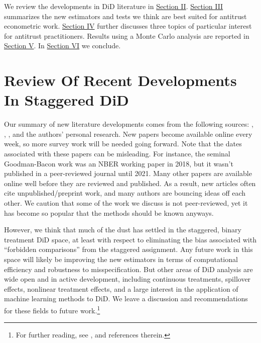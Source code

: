 \documentclass[12pt]{article}
\begin{document}
We review the developments in DiD literature in \hyperref[sec:literature]{Section II}. \hyperref[sec:analysis]{Section III} summarizes the new estimators and tests we think are best suited for antitrust econometric work. \hyperref[sec:antitrust]{Section IV} further discusses three topics of particular interest for antitrust practitioners. Results using a Monte Carlo analysis are reported in \hyperref[sec:analysis]{Section V}. In \hyperref[sec:conclusion]{Section VI} we conclude.

\section{Review Of Recent Developments In Staggered DiD} \label{sec:literature}
\begin{singlespace*}
\end{singlespace*}
\noindent Our summary of new literature developments comes from the following sources: \citet{baker2022much}, \citet{de2023two}, \citet{roth2023s}, and the authors’ personal research. New papers become available online every week, so more survey work will be needed going forward. Note that the dates associated with these papers can be misleading. For instance, the seminal Goodman-Bacon work was an NBER working paper in 2018,  but it wasn’t published in a peer-reviewed journal until 2021. Many other papers are available online well before they are reviewed and published. As a result, new articles often cite unpublished/preprint work, and many authors are bouncing ideas off each other. We caution that some of the work we discuss is not peer-reviewed, yet it has become so popular that the methods should be known anyways.

However, we think that much of the dust has settled in the staggered, binary treatment DiD space, at least with respect to eliminating the bias associated with “forbidden comparisons” from the staggered assignment. Any future work in this space will likely be improving the new estimators in terms of computational efficiency and robustness to misspecification. But other areas of DiD analysis are wide open and in active development, including continuous treatments, spillover effects, nonlinear treatment effects, and a large interest in the application of machine learning methods to DiD. We leave a discussion and recommendations for these fields to future work.\footnote{For further reading, see \citet{roth2023s}, \citet{de2023two} and references therein.}
\end{document}
